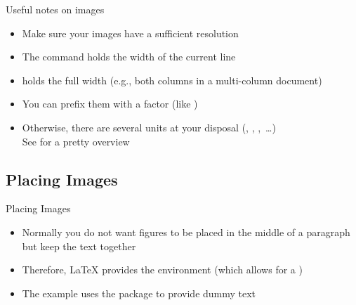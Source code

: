 \savebox{}
\begin{frame}{Useful notes on images}
   \begin{itemize}
      \itemsep8pt
      \item Make sure your images have a sufficient resolution
      \item The command \blatex{\\linewidth} holds the width of the current line
      \item \blatex{\\textwidth} holds the full width (e.g., both columns in a multi-column document)
      \item You can prefix them with a factor (like )
      \item Otherwise, there are several units at your disposal (, , ,~\ldots)\\See {} for a pretty overview
   \end{itemize}
\end{frame}

\subsection{Placing Images}

\begin{frame}{Placing Images}
   \begin{itemize}
      \item Normally you do not want figures to be placed in the middle of a paragraph but keep the text together
      \item Therefore, \LaTeX{} provides the  environment (which allows for a \blatex{\\caption})
      \item The example uses the  package to provide dummy text
   \end{itemize}
\end{frame}

